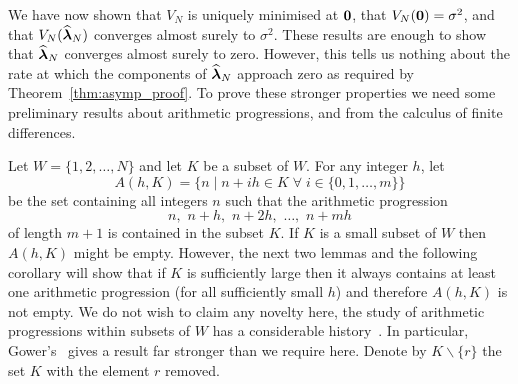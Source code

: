 \documentclass[journal]{IEEEtran}
\begin{document}

We have now shown that $V_N$ is uniquely minimised at $\boldsymbol{0}$, that $V_N(\boldsymbol{0}) = \sigma^2$, and that $V_N(\widehat{\boldsymbol{\lambda}}_N)$ converges almost surely to $\sigma^2$.  These results are enough to show that $\widehat{\boldsymbol{\lambda}}_N$ converges almost surely to zero.  However, this tells us nothing about the rate at which the components of $\widehat{\boldsymbol{\lambda}}_N$ approach zero as required by Theorem~\ref{thm:asymp_proof}.  To prove these stronger properties we need some preliminary results about arithmetic progressions, and from the calculus of finite differences.
 
Let $W = \{1,2,\dots, N\}$ and let $K$ be a subset of $W$.  For any integer $h$, let
\begin{equation} \label{eq:S(h,G)def} 
A(h,K) = \big\{ n \mid n + ih \in K \;\forall\; i \in \{0,1,\dots,m\} \big\}
\end{equation}
be the set containing all integers $n$ such that the arithmetic progression
\[
n, \,\, n + h, \,\, n + 2h, \,\, \dots, \,\, n + mh
\]
of length $m+1$ is contained in the subset $K$.  If $K$ is a small subset of $W$ then $A(h,K)$ might be empty. However, the next two lemmas and the following corollary will show that if $K$ is sufficiently large then it always contains at least one arithmetic progression (for all sufficiently small $h$) and therefore $A(h,K)$ is not empty. We do not wish to claim any novelty here, the study of arithmetic progressions within subsets of $W$ has a considerable history~\cite{Erdos_on_some_sequence_of_integers1936,Szemeredi_setint_no_k_arth1975,Gowers_new_proof2001}.  In particular, Gower's~\cite[Theorem 1.3]{Gowers_new_proof2001} gives a result far stronger than we require here.  Denote by $K \backslash \{r\}$ the set $K$ with the element $r$ removed.
\end{document}

